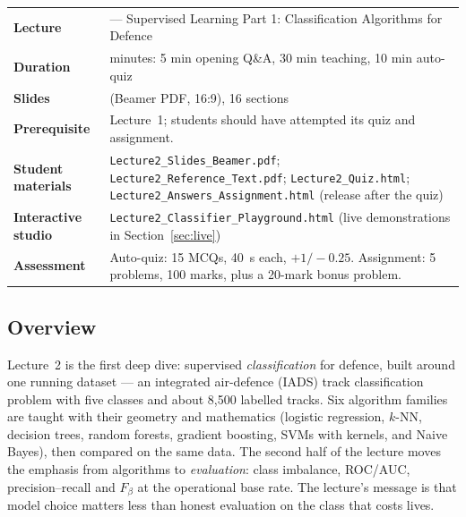 \documentclass[11pt]{article}
\begin{document}
\begin{center}\small\renewcommand{\arraystretch}{1.25}\begin{tabularx}{\textwidth}{@{}>{\bfseries}p{3.3cm}>{\raggedright\arraybackslash}X@{}}\toprule

\textcolor{NavyN}{Lecture}&2 --- Supervised Learning Part 1: Classification Algorithms for Defence\\
\textcolor{NavyN}{Duration}&45 minutes: 5 min opening Q\&A, 30 min teaching, 10 min auto-quiz\\
\textcolor{NavyN}{Slides}&29 (Beamer PDF, 16:9), 16 sections\\
\textcolor{NavyN}{Prerequisite}&Lecture~1; students should have attempted its quiz and assignment.\\
\textcolor{NavyN}{Student materials}&\texttt{Lecture2\_Slides\_Beamer.pdf}; \texttt{Lecture2\_Reference\_Text.pdf}; \texttt{Lecture2\_Quiz.html}; \texttt{Lecture2\_Answers\_Assignment.html} (release after the quiz)\\
\textcolor{NavyN}{Interactive studio}&\texttt{Lecture2\_Classifier\_Playground.html} (live demonstrations in Section~\ref{sec:live})\\
\textcolor{NavyN}{Assessment}&Auto-quiz: 15 MCQs, 40~s each, $+1/-0.25$. Assignment: 5 problems, 100 marks, plus a 20-mark bonus problem.\\\bottomrule\end{tabularx}\end{center}

\subsection*{Overview}Lecture~2 is the first deep dive: supervised \emph{classification} for defence, built around one running dataset --- an integrated air-defence (IADS) track classification problem with five classes and about 8,500 labelled tracks. Six algorithm families are taught with their geometry and mathematics (logistic regression, $k$-NN, decision trees, random forests, gradient boosting, SVMs with kernels, and Naive Bayes), then compared on the same data. The second half of the lecture moves the emphasis from algorithms to \emph{evaluation}: class imbalance, ROC/AUC, precision--recall and $F_\beta$ at the operational base rate. The lecture's message is that model choice matters less than honest evaluation on the class that costs lives.
\end{document}
